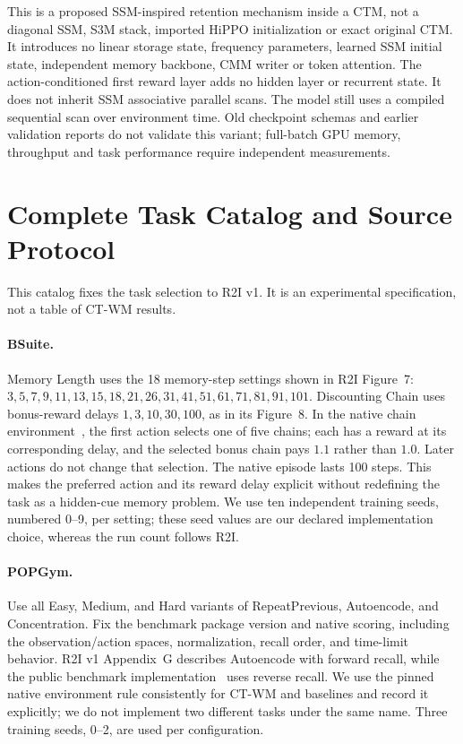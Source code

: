 \documentclass{article}
\begin{document}
This is a proposed SSM-inspired retention mechanism inside a CTM, not a diagonal SSM, S3M stack, imported HiPPO initialization or exact original CTM. It introduces no linear storage state, frequency parameters, learned SSM initial state, independent memory backbone, CMM writer or token attention. The action-conditioned first reward layer adds no hidden layer or recurrent state. It does not inherit SSM associative parallel scans. The model still uses a compiled sequential scan over environment time. Old checkpoint schemas and earlier validation reports do not validate this variant; full-batch GPU memory, throughput and task performance require independent measurements.

\section{Complete Task Catalog and Source Protocol}
\label{app:task_catalog}

This catalog fixes the task selection to R2I v1. It is an experimental specification, not a table of CT-WM results.

\paragraph{BSuite.}
Memory Length uses the 18 memory-step settings shown in R2I Figure~7: $3,5,7,9,11,13,15,18,21,26,31,41,51,61,71,81,91,101$. Discounting Chain uses bonus-reward delays $1,3,10,30,100$, as in its Figure~8. In the native chain environment~\cite{bsuite2020code}, the first action selects one of five chains; each has a reward at its corresponding delay, and the selected bonus chain pays $1.1$ rather than $1.0$. Later actions do not change that selection. The native episode lasts 100 steps. This makes the preferred action and its reward delay explicit without redefining the task as a hidden-cue memory problem. We use ten independent training seeds, numbered 0--9, per setting; these seed values are our declared implementation choice, whereas the run count follows R2I.

\paragraph{POPGym.}
Use all Easy, Medium, and Hard variants of RepeatPrevious, Autoencode, and Concentration. Fix the benchmark package version and native scoring, including the observation/action spaces, normalization, recall order, and time-limit behavior. R2I v1 Appendix~G describes Autoencode with forward recall, while the public benchmark implementation~\cite{popgym2023code} uses reverse recall. We use the pinned native environment rule consistently for CT-WM and baselines and record it explicitly; we do not implement two different tasks under the same name. Three training seeds, 0--2, are used per configuration.
\end{document}
